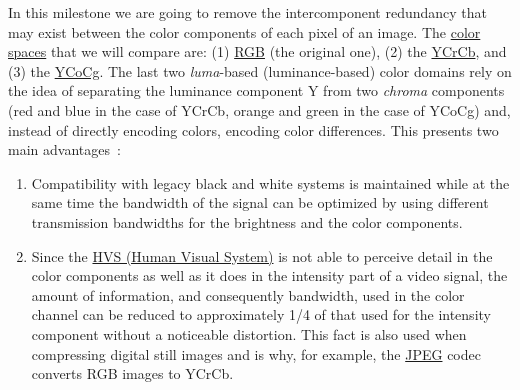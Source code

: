 In this milestone we are going to remove the intercomponent redundancy
that may exist between the color components of each pixel of an
image. The \href{https://en.wikipedia.org/wiki/Color_space}{color
  spaces} that we will compare are: (1)
\href{https://en.wikipedia.org/wiki/RGB_color_model}{RGB} (the original one), (2) the
\href{https://en.wikipedia.org/wiki/YCbCr}{YCrCb}, and (3) the
\href{https://en.wikipedia.org/wiki/YCoCg}{YCoCg}. The last two
\emph{luma}-based (luminance-based) color domains rely on the idea of
separating the luminance component Y from two \emph{chroma} components
(red and blue in the case of YCrCb, orange and green in the case of
YCoCg) and, instead of directly encoding colors, encoding color
diﬀerences. This presents two main
advantages~\cite{burger2016digital}:
\begin{enumerate}
\item Compatibility with legacy black and white systems is maintained
  while at the same time the bandwidth of the signal can be optimized
  by using diﬀerent transmission bandwidths for the brightness and the
  color components.
\item Since the \href{https://en.wikipedia.org/wiki/Visual_system}{HVS
  (Human Visual System)} is not able to perceive detail in the color
  components as well as it does in the intensity part of a video
  signal, the amount of information, and consequently bandwidth, used
  in the color channel can be reduced to approximately 1/4 of that
  used for the intensity component without a noticeable
  distortion. This fact is also used when compressing digital still
  images and is why, for example, the
  \href{https://en.wikipedia.org/wiki/JPEG}{JPEG} codec converts RGB
  images to YCrCb.
\end{enumerate}

